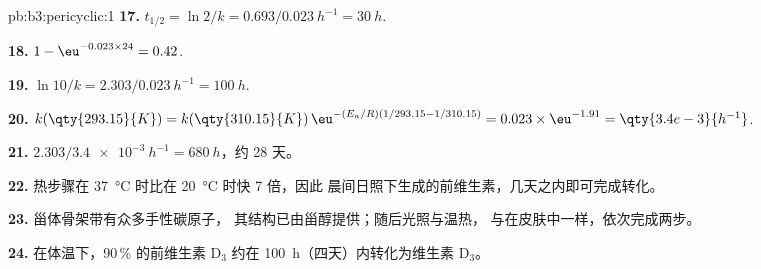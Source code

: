 \begin{solution}{pb:b3:pericyclic:1}
\textbf{17.} $t_{1/2} = \ln 2/k = 0.693/\qty{0.023}{h^{-1}} = \qty{30}{h}$.

\textbf{18.} $1 - \eu^{-0.023 \times 24} = 0.42$.

\textbf{19.} $\ln 10/k = 2.303/\qty{0.023}{h^{-1}} = \qty{100}{h}$.

\textbf{20.} $k(\qty{293.15}{K}) = k(\qty{310.15}{K})\,\eu^{-(E_a/R)(1/293.15 - 1/310.15)} = 0.023 \times \eu^{-1.91} = \qty{3.4e-3}{h^{-1}}$.

\textbf{21.} $2.303/\qty{3.4e-3}{h^{-1}} = \qty{680}{h}$，约 28 天。

\textbf{22.} 热步骤在 \qty{37}{\celsius} 时比在 \qty{20}{\celsius} 时快 7 倍，因此
晨间日照下生成的前维生素，几天之内即可完成转化。

\textbf{23.} 甾体骨架带有众多手性碳原子，
其结构已由甾醇提供；随后光照与温热，
与在皮肤中一样，依次完成两步。

\textbf{24.} 在体温下，90\,\% 的前维生素 D$_3$ 约在
\qty{100}{h}（四天）内转化为维生素 D$_3$。
\end{solution}
